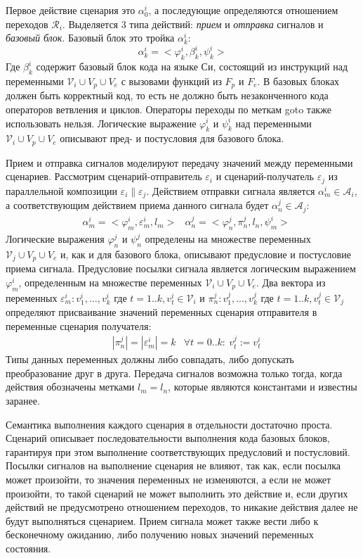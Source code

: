\documentclass[%
candidate,     %
href,        %
colorlinks,  %
]{disser}
\begin{document}
Первое действие сценария это $\alpha^i_0$, а последующие определяются отношением переходов $\mathcal{R}_i$. 
Выделяется 3 типа действий: \textit{прием} и \textit{отправка} сигналов и \textit{базовый блок}.
Базовый блок это тройка $\alpha^i_k$:
\[\alpha^i_k = <\varphi^i_k, \beta^i_k, \psi^i_k> \]
Где $\beta^i_k$ содержит базовый блок кода на языке Си, состоящий из инструкций над переменными $\mathcal{V}_i \cup V_p \cup V_e$ с вызовами функций из $F_p$ и $F_e$.
В базовых блоках должен быть корректный код, то есть не должно быть незаконченного кода операторов ветвления и циклов.
Операторы переходы по меткам goto также использовать нельзя.
Логические выражение $\varphi^i_k$ и $\psi^i_k$ над переменными $\mathcal{V}_i \cup V_p \cup V_e$ описывают пред- и постусловия для базового блока.

Прием и отправка сигналов моделируют передачу значений между переменными сценариев.
Рассмотрим сценарий-отправитель $\varepsilon_i$ и сценарий-получатель $\varepsilon_j$ из параллельной композиции $\varepsilon_i \parallel \varepsilon_j$.
Действием отправки сигнала является $\alpha^i_m \in \mathcal{A}_i$, а соответствующим действием приема данного сигнала будет $\alpha^j_n \in \mathcal{A}_j$:
\begin{align*}
&\alpha^i_m = <\varphi^i_m, \varepsilon^i_m, l_m>
&\alpha^j_n = <\varphi^j_n, \pi^j_n, l_n, \psi^i_m>    
\end{align*}
Логические выражения $\varphi^j_n$ и $\psi^j_n$ определены на множестве переменных $\mathcal{V}_j \cup V_p \cup V_e$ и, как и для базового блока, описывают предусловие и постусловие приема сигнала.
Предусловие посылки сигнала является логическим выражением $\varphi^i_m$, определенным на множестве переменных $\mathcal{V}_i \cup V_p \cup V_e$.
Два вектора из переменных $\varepsilon^i_m: {v^i_1, ..., v^i_k}$ где $t = 1..k, v^i_t \in \mathcal{V}_i$ и $\pi^j_n: {v^j_1, ..., v^j_k}$ где $t = 1..k, v^j_t \in \mathcal{V}_j$ определяют присваивание значений переменных сценария отправителя в переменные сценария получателя:
\begin{align*}
&|\pi^j_n| = |\varepsilon^i_m| = k 
&\forall t = 0..k:~v^j_t := v^i_t
\end{align*}
Типы данных переменных должны либо совпадать, либо допускать преобразование друг в друга.
Передача сигналов возможна только тогда, когда действия обозначены метками $l_m = l_n$, которые являются константами и известны заранее.

Семантика выполнения каждого сценария в отдельности достаточно проста.
Сценарий описывает последовательности выполнения кода базовых блоков, гарантируя при этом выполнение соответствующих предусловий и постусловий.
Посылки сигналов на выполнение сценария не влияют, так как, если посылка может произойти, то значения переменных не изменяются, а если не может произойти, то такой сценарий не может выполнить это действие и, если других действий не предусмотрено отношением переходов, то никакие действия далее не будут выполняться сценарием.
Прием сигнала может также вести либо к бесконечному ожиданию, либо получению новых значений переменных состояния.
\end{document}
